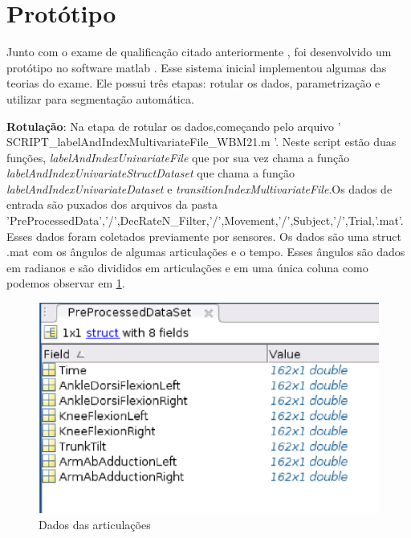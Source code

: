 \section{Protótipo}
\label{Sec:protótipo}
  Junto com o exame de qualificação citado anteriormente \cite{roberto}, foi 
desenvolvido um protótipo no software matlab \cite{matlab}. Esse sistema inicial
implementou algumas das teorias do exame. Ele possui três etapas: rotular os dados,
parametrização e utilizar para segmentação automática.
\begin{itemize}

\begin{sloppypar}

\item \textbf{Rotulação}: Na etapa de rotular os dados,começando pelo arquivo
' SCRIPT\_labelAndIndexMultivariateFile\_WBM21.m '. Neste script estão duas funções, 
\textit{labelAndIndexUnivariateFile} que por sua vez chama a função 
\textit{labelAndIndexUnivariateStructDataset} que chama a função \textit{labelAndIndexUnivariateDataset}
e \textit{transitionIndexMultivariateFile}.Os dados de entrada são puxados dos arquivos da pasta 
'PreProcessedData','/',DecRateN\_Filter,'/',Movement,'/',Subject,'/',Trial,'.mat'.
Esses dados foram coletados previamente por sensores. Os dados são uma struct .mat
com  os ângulos de algumas articulações e o tempo. Esses ângulos são dados em radianos
 e são divididos em articulações e em uma única coluna como podemos observar em \ref{structMatlab}.

\begin{figure}[!h]                                                               
\centering                                                                         
\includegraphics [keepaspectratio=true,scale=0.60]{figuras/structMatlab.eps}                                
\caption{Dados das articulações}                                        
\label{structMatlab}                                                        
\end{figure} 


\end{sloppypar}
\end{itemize}
